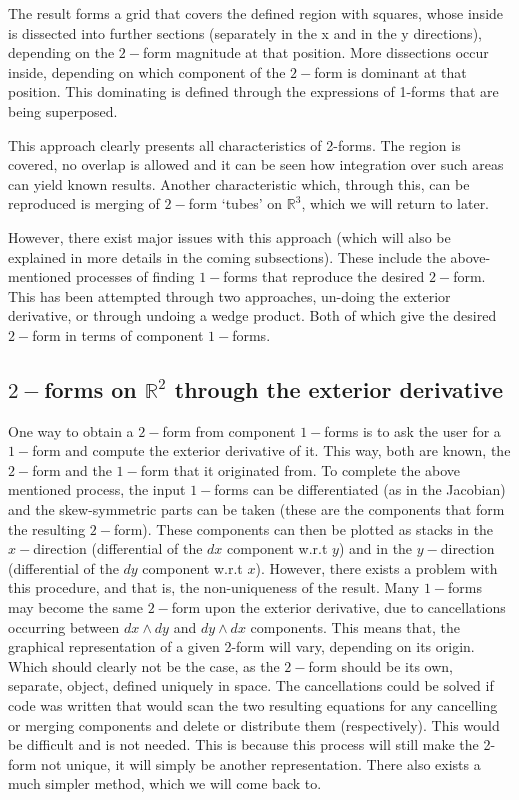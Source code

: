 \documentclass[12pt]{report}
\begin{document}
\noindent The result forms a grid that covers the defined region with squares, whose inside is dissected into further sections (separately in the x and in the y directions), depending on the $2-$form magnitude at that position. More dissections occur inside, depending on which component of the $2-$form is dominant at that position. This dominating is defined through the expressions of 1-forms that are being superposed.

This approach clearly presents all characteristics of 2-forms. The region is covered, no overlap is allowed and it can be seen how integration over such areas can yield known results. Another characteristic which, through this, can be reproduced is merging of $2-$form `tubes' on $\mathbb{R}^{3}$, which we will return to later.

However, there exist major issues with this approach (which will also be explained in more details in the coming subsections). These include the above-mentioned processes of finding $1-$forms that reproduce the desired $2-$form. This has been attempted through two approaches, un-doing the exterior derivative, or through undoing a wedge product. Both of which give the desired $2-$form in terms of component $1-$forms.


\subsection{$2-$forms on $\mathbb{R}^2$ through the exterior derivative}
One way to obtain a $2-$form from component $1-$forms is to ask the user for a $1-$form and compute the exterior derivative of it. This way, both are known, the $2-$form and the $1-$form that it originated from. To complete the above mentioned process, the input $1-$forms can be differentiated (as in the Jacobian) and the skew-symmetric parts can be taken (these are the components that form the resulting $2-$form). These components can then be plotted as stacks in the $x-$direction (differential of the $dx$ component w.r.t $y$) and in the $y-$direction (differential of the $dy$ component w.r.t $x$). However, there exists a problem with this procedure, and that is, the non-uniqueness of the result. Many $1-$forms may become the same $2-$form upon the exterior derivative, due to cancellations occurring between $dx \wedge dy$ and $dy\wedge dx$ components.  This means that, the graphical representation of a given 2-form will vary, depending on its origin. Which should clearly not be the case, as the $2-$form should be its own, separate, object, defined uniquely in space.
The cancellations could be solved if code was written that would scan the two resulting equations for any cancelling or merging components and delete or distribute them (respectively). This would be difficult and is not needed. This is because this process will still make the 2-form not unique, it will simply be another representation. There also exists a much simpler method, which we will come back to.
\end{document}
